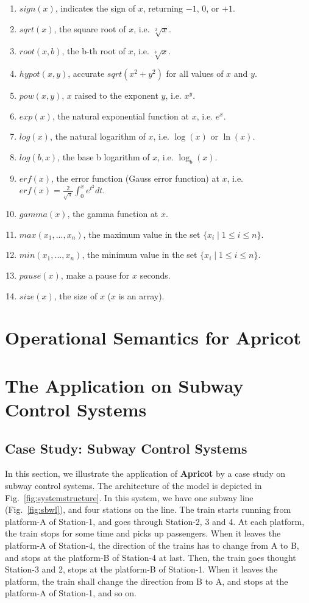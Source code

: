 \documentclass{WileySix}
\newcommand{\apricot}{\bfseries Apricot}
\begin{document}
\begin{enumerate}
\item $sign(x)$, indicates the sign of $x$, returning $-1$, $0$, or $+1$.
\item $sqrt(x)$, the square root of $x$, i.e. $\sqrt[2]{x}$.
\item $root(x,b)$, the b-th root of $x$, i.e. $\sqrt[b]{x}$.
\item $hypot(x,y)$, accurate $sqrt(x^2 + y^2)$ for all values of $x$ and $y$.
\item $pow(x,y)$, $x$ raised to the exponent $y$, i.e. $x^y$.
\item $exp(x)$, the natural exponential function at $x$, i.e. $e^x$.
\item $log(x)$, the natural logarithm of $x$, i.e. $\log(x)$ or $\ln(x)$.
\item $log(b,x)$, the base b logarithm of $x$, i.e. $\log_b(x)$.
\item $erf(x)$, the error function (Gauss error function) at $x$, i.e. $erf(x)=\frac{2}{\sqrt{\pi}}\int_0^x{e^{t^2}dt}$.
\item $gamma(x)$, the gamma function at $x$.
\item $max(x_1,...,x_n)$, the maximum value in the set $\{x_i \mid 1 \leq i \leq n \}$.
\item $min(x_1,...,x_n)$, the minimum value in the set $\{x_i \mid 1 \leq i \leq n \}$.
\item $pause(x)$, make a pause for $x$ seconds.
\item $size(x)$, the size of $x$ ($x$ is an array).  
\end{enumerate}


\chapter[Operational Semantics for Apricot]{Operational Semantics for Apricot}

\chapter[The Application on Subway Control Systems]{The Application on Subway Control Systems}

\section{Case Study: Subway Control Systems}\label{sec:case study}
In this section, we illustrate the application of {\apricot} by a case study on subway control systems. The architecture of the model is depicted in Fig.~\ref{fig:systemstructure}.
In this system, we have one subway line (Fig.~\ref{fig:sbwl}), and four stations on the line.
The train starts running from platform-A of Station-1, and goes through Station-2, 3 and 4.
At each platform, the train stops for some time and picks up passengers.
When it leaves the platform-A of Station-4, the direction of the trains has to change from A to B, and stops at the platform-B of Station-4 at last. Then, the train goes thought Station-3 and 2, stops at the platform-B of Station-1. When it leaves the platform, the train shall change the direction from B to A, and stops at the platform-A of Station-1, and so on.
\end{document}

